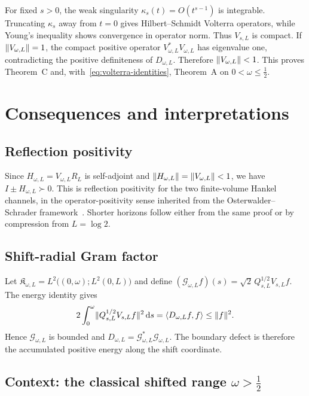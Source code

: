 \documentclass[11pt,a4paper]{article}
\newcommand{\dd}{\,\mathrm d}
\newcommand{\Gcal}{\mathcal G}
\newcommand{\Kfrak}{\mathfrak K}
\DeclarePairedDelimiter{\norm}{\lVert}{\rVert}
\theoremstyle{plain}
\theoremstyle{definition}
\numberwithin{equation}{section}
\begin{document}
For fixed $s>0$, the weak singularity $\kappa_s(t)=O(t^{s-1})$ is integrable.
Truncating $\kappa_s$ away from $t=0$ gives Hilbert--Schmidt Volterra
operators, while Young's inequality shows convergence in operator norm. Thus
$V_{s,L}$ is compact. If $\norm{V_{\omega,L}}=1$, the compact positive operator
$V_{\omega,L}^{*}V_{\omega,L}$ has eigenvalue one, contradicting the positive
definiteness of $D_{\omega,L}$. Therefore $\norm{V_{\omega,L}}<1$. This proves
Theorem~C and, with~\eqref{eq:volterra-identities}, Theorem~A on
$0<\omega\le\tfrac12$.

\section{Consequences and interpretations}

\subsection{Reflection positivity}

Since $H_{\omega,L}=V_{\omega,L}R_L$ is self-adjoint and
$\norm{H_{\omega,L}}=\norm{V_{\omega,L}}<1$, we have $I\pm H_{\omega,L}\succ0$.
This is reflection positivity for the two finite-volume Hankel channels, in
the operator-positivity sense inherited from the Osterwalder--Schrader
framework~\cite{OS1973}. Shorter horizons follow either from the same proof or
by compression from $L=\log2$.

\subsection{Shift-radial Gram factor}

Let $\Kfrak_{\omega,L}=L^2\bigl((0,\omega);L^2(0,L)\bigr)$ and define
$(\Gcal_{\omega,L}f)(s)=\sqrt2\,Q_{s,L}^{1/2}V_{s,L}f$. The energy identity
gives
\begin{equation}
2\int_0^\omega\norm{Q_{s,L}^{1/2}V_{s,L}f}^2\dd s=\langle D_{\omega,L}f,f\rangle\le\norm f^2 .
\end{equation}
Hence $\Gcal_{\omega,L}$ is bounded and
$D_{\omega,L}=\Gcal_{\omega,L}^{*}\Gcal_{\omega,L}$. The boundary defect is
therefore the accumulated positive energy along the shift coordinate.

\subsection{Context: the classical shifted range \texorpdfstring{$\omega>\tfrac12$}{omega > 1/2}}\label{sec:known-range}
\end{document}
